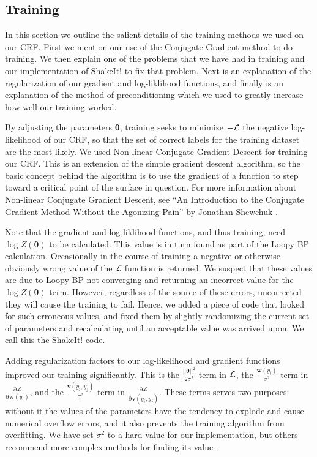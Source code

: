 \documentclass[10pt]{acmsiggraph}               %
\newcommand{\bm}[1]{\boldsymbol{#1}}
\begin{document}
\subsection{Training}
In this section we outline the salient details of the training methods we used on our CRF.  First we mention our use of the Conjugate Gradient method to do training.  We then explain one of the problems that we have had in training and our implementation of ShakeIt! to fix that problem. Next is an explanation of the regularization of our gradient and log-liklihood functions, and finally is an explanation of the method of preconditioning which we used to greatly increase how well our training worked.

By adjusting the parameters $\bm{\theta}$, training seeks to minimize $-\cal L$ the negative log-likelihood of our CRF, so that the set of correct labels for the training dataset are the most likely.  We used Non-linear Conjugate Gradient Descent for training our CRF.  This is an extension of the simple gradient descent algorithm, so the basic concept behind the algorithm is to use the gradient of a function to step toward a critical point of the surface in question.  For more information about Non-linear Conjugate Gradient Descent, see ``An Introduction to the Conjugate Gradient Method Without the Agonizing Pain'' by Jonathan Shewchuk \cite{shewchuk:ConjGrad}.

Note that the gradient and log-liklihood functions, and thus training, need $\log Z(\bm{\theta})$ to be calculated.  This value is in turn found as part of the Loopy BP calculation.  Occasionally in the course of training a negative or otherwise obviously wrong value of the $\mathcal L$ function is returned. We suspect that these values are due to Loopy BP not converging and returning an incorrect value for the $\log Z(\bm{\theta})$ term. However, regardless of the source of these errors, uncorrected they will cause the training to fail. Hence, we added a piece of code that looked for such erroneous values, and fixed them by slightly randomizing the current set of parameters and recalculating until an acceptable value was arrived upon. We call this the ShakeIt! code.

Adding regularization factors to our log-likelihood and gradient functions improved our training significantly.  This is the $\frac{||\bm{\theta}||^2}{2\sigma^2}$ term in $\cal L$, the $\frac{\bm{w}(y_i)}{\sigma^2}$ term in $\frac{\mathrm{\partial}\mbox{$\mathcal L$}}{\mathrm{\partial}\bm{w}(y_i)}$, and the $\frac{\bm{v}(y_i,y_j)}{\sigma^2}$ term in $\frac{\mathrm{\partial}\mbox{$\mathcal L$}}{\mathrm{\partial}\bm{v}(y_i,y_j)}$.  These terms serves two purposes:  without it the values of the parameters have the tendency to explode and cause numerical overflow errors, and it also prevents the training algorithm from overfitting.  We have set $\sigma^2$ to a hard value for our implementation, but others recommend more complex methods for finding its value \cite{szummer:HRF}.
\end{document}

